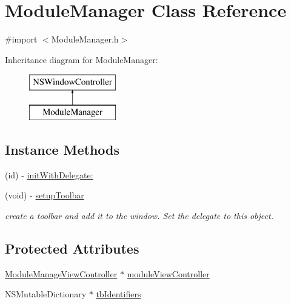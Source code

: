\hypertarget{interface_module_manager}{\section{Module\-Manager Class Reference}
\label{interface_module_manager}
}


{\ttfamily \#import $<$Module\-Manager.\-h$>$}

Inheritance diagram for Module\-Manager\-:\begin{figure}[H]
\begin{center}
\leavevmode
\includegraphics[height=2.000000cm]{interface_module_manager}
\end{center}
\end{figure}
\subsection*{Instance Methods}
\begin{DoxyCompactItemize}
\item 
(id) -\/ \hyperlink{interface_module_manager_a31987d71b58e0520588676a4f6896d2c}{init\-With\-Delegate\-:}
\item 
(void) -\/ \hyperlink{interface_module_manager_afb4c8baa0460815fc268a5c162e30b26}{setup\-Toolbar}
\begin{DoxyCompactList}\small\item\em create a toolbar and add it to the window. Set the delegate to this object. \end{DoxyCompactList}\end{DoxyCompactItemize}
\subsection*{Protected Attributes}
\begin{DoxyCompactItemize}
\item 
\hyperlink{interface_module_manage_view_controller}{Module\-Manage\-View\-Controller} $\ast$ \hyperlink{interface_module_manager_a0360f8995e4b5f956ded98af3e220355}{module\-View\-Controller}
\item 
N\-S\-Mutable\-Dictionary $\ast$ \hyperlink{interface_module_manager_a93d7f18be64aa1f313d2e619660cbef0}{tb\-Identifiers}
\end{DoxyCompactItemize}
